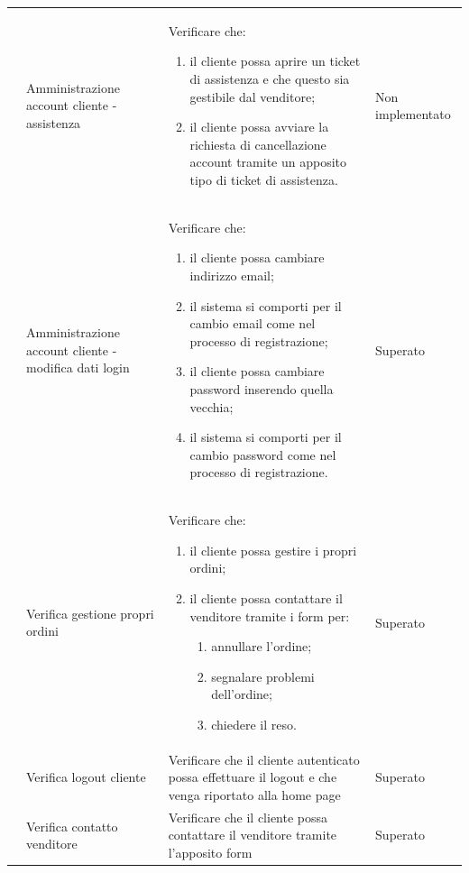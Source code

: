 \begin{center}
\begin{longtable}{|p{0.85cm}|p{2.25cm}|p{9cm}|p{3cm}|}
		 & Amministrazione account cliente - assistenza & Verificare che:
		\begin{enumerate}
			\item il cliente possa aprire un ticket di assistenza e che questo sia gestibile dal venditore;
			\item il cliente possa avviare la richiesta di cancellazione account tramite un apposito tipo di ticket di assistenza.
		\end{enumerate} & Non implementato\\

		 & Amministrazione account cliente - modifica dati login & Verificare che:
		\begin{enumerate}
			\item il cliente possa cambiare indirizzo email;
			\item il sistema si comporti per il cambio email come nel processo di registrazione;
			\item il cliente possa cambiare password inserendo quella vecchia;
			\item il sistema si comporti per il cambio password come nel processo di registrazione. 
		\end{enumerate} & Superato\\

		 & Verifica gestione propri ordini & Verificare che:
		\begin{enumerate}
			\item il cliente possa gestire i propri ordini;
			\item il cliente possa contattare il venditore tramite i form per:
			\begin{enumerate}
				\item annullare l'ordine;
				\item segnalare problemi dell'ordine;
				\item chiedere il reso.
			\end{enumerate}
		\end{enumerate} & Superato\\

		 & Verifica logout cliente & Verificare che il cliente autenticato possa effettuare il logout e che venga riportato alla home page & Superato\\

		 & Verifica contatto venditore & Verificare che il cliente possa contattare il venditore tramite l'apposito form  & Superato\\


\end{longtable}
\end{center}
